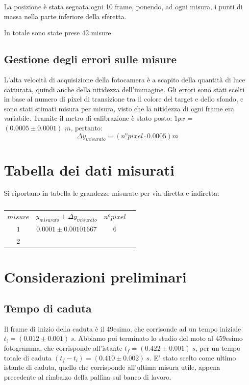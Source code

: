 \documentclass[12pt, a4paper]{article}
\begin{document}
La posizione è stata segnata ogni 10 frame, ponendo, ad ogni misura, i punti di massa nella parte inferiore della sferetta. 

In totale sono state prese 42 misure.


\subsection{Gestione degli errori sulle misure}
L'alta velocità di acquisizione della fotocamera è a scapito della quantità di luce catturata, quindi anche della nitidezza dell'immagine.
Gli errori sono stati scelti in base al numero di pixel di transizione tra il colore del target e dello sfondo, e sono stati stimati misura per misura, visto che la nitidezza di ogni frame era variabile. Tramite il metro di calibrazione è stato posto: 1$px$ = $(0.0005\pm 0.0001)$ $m$, pertanto:
\begin{equation*}
    \Delta y_{misurato}= (n^o pixel \cdot 0.0005)m
\end{equation*}

\bigskip

\section{Tabella dei dati misurati}

Si riportano in tabella le grandezze misurate per via diretta e indiretta:

\begin{longtable}{|c|c|c|c|}
\caption{}
\hline
\multirow{2}{*}{$misure$}&
\multirow{2}{*}{$y_{misurato} \pm \Delta y_{misurato}$}&
\multirow{2}{*}{$n^o pixel$} 
\\ && \\
\hline 
$1$ & $0.0001 \pm 0.00101667$ & $6$ \\ 
$2$ & $$


\end{longtable}

\section{Considerazioni preliminari}

\subsection{Tempo di caduta}
Il frame di inizio della caduta è il 49esimo, che corrisonde ad un tempo iniziale \textit{$t_i = (0.012\pm 0.001)\ s$}.
Abbiamo poi terminato lo studio del moto al 459esimo fotogramma, che corrisponde all'istante \textit{$t_f = (0.422\pm 0.001)\ s$}, per un tempo totale di caduta \textit{$(t_f-t_i) = (0.410\pm 0.002)\ s$}. 
E' stato scelto come ultimo istante di caduta, quello che corrisponde all'ultima misura utile, appena precedente al rimbalzo della pallina sul banco di lavoro.\\
\end{document}
